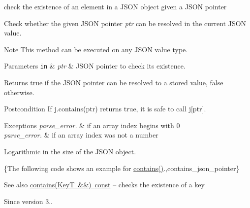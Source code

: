 check the existence of an element in a J\+S\+ON object given a J\+S\+ON pointer 

Check whether the given J\+S\+ON pointer {\itshape ptr} can be resolved in the current J\+S\+ON value.

\begin{DoxyNote}{Note}
This method can be executed on any J\+S\+ON value type.
\end{DoxyNote}

\begin{DoxyParams}[1]{Parameters}
\mbox{\tt in}  & {\em ptr} & J\+S\+ON pointer to check its existence.\\
\hline
\end{DoxyParams}
\begin{DoxyReturn}{Returns}
true if the J\+S\+ON pointer can be resolved to a stored value, false otherwise.
\end{DoxyReturn}
\begin{DoxyPostcond}{Postcondition}
If {\ttfamily j.\+contains(ptr)} returns true, it is safe to call {\ttfamily j\mbox{[}ptr\mbox{]}}.
\end{DoxyPostcond}

\begin{DoxyExceptions}{Exceptions}
{\em parse\+\_\+error.} & if an array index begins with \textquotesingle{}0\textquotesingle{} \\
\hline
{\em parse\+\_\+error.} & if an array index was not a number\\
\hline
\end{DoxyExceptions}
Logarithmic in the size of the J\+S\+ON object.

\{The following code shows an example for {\ttfamily \mbox{\hyperlink{classnlohmann_1_1basic__json_a9286acdc0578fc66e9346323e69fc0e3}{contains()}}}.,contains\+\_\+json\+\_\+pointer\}

\begin{DoxySeeAlso}{See also}
\mbox{\hyperlink{classnlohmann_1_1basic__json_a9286acdc0578fc66e9346323e69fc0e3}{contains(\+Key\+T \&\&) const}} -- checks the existence of a key
\end{DoxySeeAlso}
\begin{DoxySince}{Since}
version 3.. 
\end{DoxySince}
\mbox{\label{classnlohmann_1_1basic__json_a0d74bfcf65662f1d66d14c34b0027098}} 
